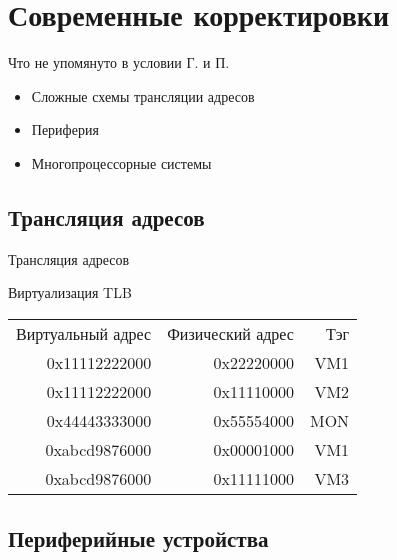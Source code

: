 \section{Современные корректировки}

\begin{frame}{Что не упомянуто в условии Г. и П.}

\begin{itemize}
    \item Сложные схемы трансляции адресов
    \item Периферия
    \item Многопроцессорные системы
\end{itemize}
\end{frame}

\subsection{Трансляция адресов}

\begin{frame}[shrink=20]{Трансляция адресов}
\centering
{} 
\end{frame}

\begin{frame}{Виртуализация TLB}
\begin{center}
\begin{tabular}{rrr}
Виртуальный адрес & Физический адрес & Тэг\\
0x11112222000 &  0x22220000 & VM1\\
0x11112222000 &  0x11110000 & VM2\\
0x44443333000 &  0x55554000 & MON\\
0xabcd9876000 &  0x00001000 & VM1\\
0xabcd9876000 &  0x11111000 & VM3
 \end{tabular}
\end{center}
\end{frame}

\subsection{Периферийные устройства}

